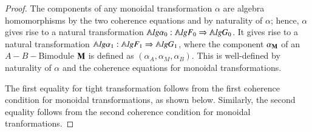 \begin{proof}
The components of any monoidal transformation $\alpha$ are algebra homomorphisms by the two coherence equations and by naturality of $\alpha$; hence, $\alpha$ gives rise to a natural transformation $\mathbb{A}\mathit{lg} \alpha_0: \mathbb{A}\mathit{lg} F_0 \Rightarrow \mathbb{A}\mathit{lg} G_0$.
It gives rise to a natural transformation $\mathbb{A}\mathit{lg} \alpha_1: \mathbb{A}\mathit{lg} F_1 \Rightarrow \mathbb{A}\mathit{lg}  G_1$, where the component $\alpha_{\bf M}$ of an $A-B-$Bimodule ${\bf M}$ is defined as $(\alpha_A, \alpha_M, \alpha_B)$. This is well-defined by naturality of $\alpha$ and the coherence equations for monoidal transformations.

The first equality for tight transformation follows from the first coherence condition for monoidal transformations, as shown below. Similarly, the second equality follows from the second coherence condition for monoidal tranformations.


\end{proof}
